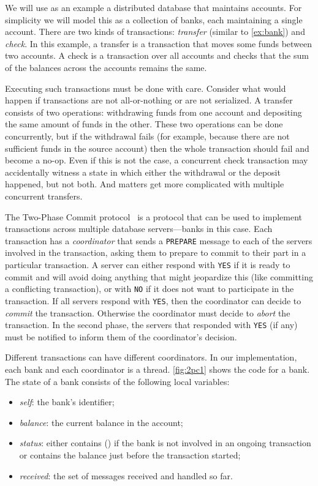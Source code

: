 \documentclass{report}
\begin{document}
{We will use as an example a distributed database that maintains accounts.
For simplicity we will model this as a collection of banks, each maintaining a
single account.  There are two kinds of transactions: \emph{transfer}
(similar to \autoref{ex:bank}) and \emph{check}.  In this example, a transfer
is a transaction that moves some funds between two accounts.
A check is a transaction over all accounts and checks that the sum of the
balances across the accounts remains the same.

Executing such transactions must be done with care.  Consider what
would happen if transactions are not all-or-nothing or are not
serialized.  A transfer consists of two operations: withdrawing
funds from one account and depositing the same amount of funds in
the other.  These two operations can be done concurrently, but if
the withdrawal fails (for example, because there are not sufficient
funds in the source account) then the whole transaction should fail
and become a no-op.  Even if this is not the case, a concurrent
check transaction may accidentally witness a state in which either
the withdrawal or the deposit happened, but not both.  And matters
get more complicated with multiple concurrent transfers.

The Two-Phase Commit protocol~\cite{Gray78} is a protocol that can be
used to implement transactions across multiple database servers---banks
in this case.
Each transaction has a \emph{coordinator} that sends a \texttt{PREPARE}
message to each of the servers involved in the transaction, asking them
to prepare to commit to their part in a particular transaction.
A server can either respond with
\texttt{YES} if it is ready to commit and will avoid doing anything
that might jeopardize this (like committing a conflicting transaction),
or with \texttt{NO} if it does not want to participate in the transaction.
If all servers respond with \texttt{YES}, then the coordinator can
decide to \emph{commit} the transaction.  Otherwise the coordinator
must decide to \emph{abort} the transaction.  In the second phase, the
servers that responded with \texttt{YES} (if any) must be notified
to inform them of the coordinator's decision.

Different transactions can have different coordinators.  In our
implementation, each bank and each coordinator is a thread.
\autoref{fig:2pc1} shows the code for a bank.
The state of a bank consists of the following local variables:
\begin{itemize}
\item \textit{self}: the bank's identifier;
\item \textit{balance}: the current balance in the account;
\item \textit{status}: either contains () if the bank is not involved in an
ongoing transaction or contains the balance
just before the transaction started;
\item \textit{received}: the set of messages received and handled so far.
\end{itemize}

}
\end{document}
